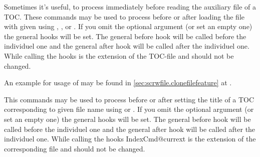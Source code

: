 \begin{Declaration}
\end{Declaration}
Sometimes it's useful, to process  immediately before
reading the auxiliary file of a TOC.  These commands may be used to process
 before or after loading the file with given
 using , , or
.  If you omit the optional argument (or set an empty
one) the general hooks will be set. The general before hook will be called
before the individuel one and the general after hook will be called after the
individuel one. While calling the hooks
 is the
extension of the TOC-file and should not be changed.

An example for usage of  may be
found in \autoref{sec:scrwfile.clonefilefeature} at
.
\EndIndexGroup


\begin{Declaration}
\end{Declaration}
This commands may be used to process  before or after
setting the title of a TOC corresponding to given file name 
using  or
. If you omit the optional argument (or set
an empty one) the general hooks will be set. The general before hook will be
called before the individuel one and the general after hook will be called
after the individuel one. While calling the hooks
IndexCmd{@currext} is the
extension of the corresponding file and should not be changed.
\EndIndexGroup


